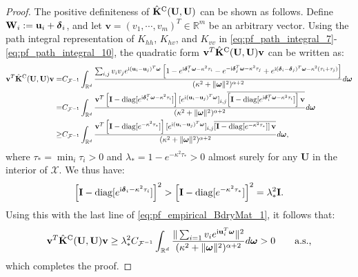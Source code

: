 \documentclass[aos,preprint]{imsart}
\theoremstyle{plain}
\DeclareMathOperator{\E}{\mathbb E}
\newcommand{\Real}{\mathbb R}
\newcommand{\CalX}{\mathcal X}
\newcommand{\BX}{\bold X}
\newcommand{\BU}{\bold U}
\newcommand{\Bu}{\bold u}
\newcommand{\BK}{\bold K}
\newcommand{\im}{\text{i}}
\newcommand{\CalF}{\mathcal{F}}
\newcommand{\Bomega}{\boldsymbol{\omega}}
\theoremstyle{remark}
\begin{document}
\begin{proof}
The positive definiteness of $\hat{\mathbf{K}}^{\rm C}(\mathbf{U},\mathbf{U})$ can be shown as follows. Define $\bold{W}_i := \Bu_i+\boldsymbol{\delta}_i$, and let $\mathbf{v}=(v_1,\cdots,v_m)^T \in \mathbb{R}^m$ be an arbitrary vector. Using the path integral representation of $K_{hh}$, $K_{hv}$, and $K_{vv}$ in \eqref{eq:pf_path_integral_7}-\eqref{eq:pf_path_integral_10}, the quadratic form $\mathbf{v}^T\hat{\BK}^{\rm C}(\mathbf{U},\mathbf{U})\mathbf{v}$ can be written as:
\small
\begin{align}
    \begin{split}
    \mathbf{v}^T\hat{\BK}^{\rm C}(\mathbf{U},\mathbf{U})\mathbf{v}=&C_{\CalF^{-1}}\int_{\Real^d}\frac{\sum_{i,j}v_iv_je^{\im(\mathbf{u}_i-\mathbf{u}_j)^T\Bomega}\left[1-e^{\im \boldsymbol{\delta}_i^T\Bomega-\kappa^2 \tau_i}-e^{-\im \boldsymbol{\delta}_j^T\Bomega-\kappa^2 \tau_j}+e^{\im(\boldsymbol{\delta}_i-\boldsymbol{\delta}_j)^T\Bomega-\kappa^2 (\tau_i+\tau_j)}\right]}{(\kappa^2+\|\Bomega\|^2)^{\alpha+2}}d\Bomega\\
    =& C_{\CalF^{-1}}\int_{\Real^d}\frac{{\mathbf{v}}^T\left[\bold{I}-\text{diag}[e^{\im \boldsymbol{\delta}_i^T\Bomega-\kappa^2 \tau_i}]\right][e^{\im (\mathbf{u}_i-\mathbf{u}_j)^T\Bomega}]_{i,j}\overline{\left[\bold{I}-\text{diag}[e^{\im \boldsymbol{\delta}_i^T\Bomega-\kappa^2 \tau_i}]\right]{\mathbf{v}}}}{(\kappa^2+\|\Bomega\|^2)^{\alpha+2}}d\Bomega\\
    \geq & C_{\CalF^{-1}}\int_{\Real^d}\frac{{\mathbf{v}}^T\left[\bold{I}-\text{diag}[e^{-\kappa^2\tau_*}]\right][e^{\im (\mathbf{u}_i-\mathbf{u}_j)^T\Bomega}]_{i,j}\overline{\left[\bold{I}-\text{diag}[e^{-\kappa^2\tau_*}]\right]{\mathbf{v}}}}{(\kappa^2+\|\Bomega\|^2)^{\alpha+2}}d\Bomega,\label{eq:pf_empirical_BdryMat_1}
\end{split}
\end{align}
\normalsize
where $\tau_*=\min_{i}\tau_i>0$   and $\lambda_*=1-e^{-\kappa^2\tau_*}>0 $ almost surely for any $\mathbf{U}$ in the interior of $\CalX$. We thus have:
\begin{align}
    \left[\bold{I}-\text{diag}[e^{\im \boldsymbol{\delta}_i-\kappa^2\tau_i}]\right]^2> \left[\bold{I}-\text{diag}[e^{-\kappa^2\tau_*}]\right]^2=\lambda_*^2\bold{I}.
\end{align}
Using this with the last line of \eqref{eq:pf_empirical_BdryMat_1}, it follows that:
\begin{equation}
\mathbf{v}^T\hat{\BK}^{\rm C}(\mathbf{U},\mathbf{U})\mathbf{v} \geq \lambda^2_* C_{\CalF^{-1}}\int_{\Real^d}\frac{\|\sum_{i=1}v_ie^{\im \Bu_i^T\Bomega}\|^2}{(\kappa^2+\|\Bomega\|^2)^{\alpha+2}}d\Bomega>0\quad\quad \text{a.s.,} 
\end{equation}
which completes the proof.

\end{proof}
\end{document}
